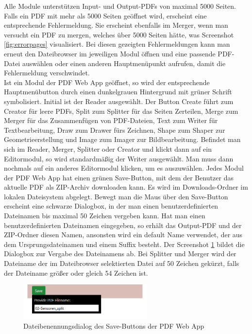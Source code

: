 Alle Module unterstützen Input- und Output-PDFs von maximal 5000 Seiten. Falls ein PDF mit mehr als 5000 Seiten geöffnet wird, erscheint eine entsprechende Fehlermeldung. Sie erscheint ebenfalls im Merger, wenn man versucht ein PDF zu mergen, welches über 5000 Seiten hätte, was Screenshot \ref{fig:errorpages} visualisiert. Bei diesen gezeigten Fehlermeldungen kann man erneut den Dateibrowser im jeweiligen Modul öffnen und eine passende PDF-Datei auswählen oder einen anderen Hauptmenüpunkt aufrufen, damit die Fehlermeldung verschwindet. \\
Ist ein Modul der PDF Web App geöffnet, so wird der entsprechende Hauptmenübutton durch einen dunkelgrauen Hintergrund mit grüner Schrift symbolisiert. Initial ist der Reader ausgewählt. Der Button Create führt zum Creator für leere PDFs, Split zum Splitter für das Seiten Zerteilen, Merge zum Merger für das Zusammenfügen von PDF-Dateien, Text zum Writer für Textbearbeitung, Draw zum Drawer fürs Zeichnen, Shape zum Shaper zur Geometrieerstellung und Image zum Imager zur Bildbearbeitung. Befindet man sich im Reader, Merger, Splitter oder Creator und klickt dann auf ein Editormodul, so wird standardmäßig der Writer ausgewählt. Man muss dann nochmals auf ein anderes Editormodul klicken, um es auszuwählen. Jedes Modul der PDF Web App hat einen grünen Save-Button, mit dem der Benutzer das aktuelle PDF als ZIP-Archiv downloaden kann. Es wird im Downloads-Ordner im lokalen Dateisystem abgelegt. Bewegt man die Maus über den Save-Button erscheint eine schwarze Dialogbox, in der man einen benutzerdefinierten Dateinamen bis maximal 50 Zeichen vergeben kann. Hat man einen benutzerdefinierten Dateinamen eingegeben, so erhält das Output-PDF und der ZIP-Ordner diesen Namen, ansonsten wird ein default Name verwendet, der aus dem Ursprungsdateinamen und einem Suffix besteht. Der Screenshot \ref{fig:save} bildet die Dialogbox zur Vergabe des Dateinamens ab. Bei Splitter und Merger wird der Dateiname der im Dateibrowser selektierten Datei auf 50 Zeichen gekürzt, falls der Dateiname größer oder gleich 54 Zeichen ist.

\begin{figure}[!htbp]
	\centering
	\includegraphics[width=0.6\textwidth]{"images/save.png"}
	\caption{Dateibenennungsdialog des Save-Buttons der PDF Web App}
	\label{fig:save}
\end{figure}

